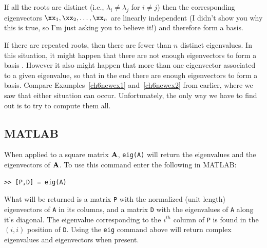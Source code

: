 If all the roots are distinct (i.e., $\lambda_i \ne \lambda_j$ for $i
\ne j$) then the corresponding eigenvectors $\xx_1,\xx_2,\ldots,\xx_n$
are linearly independent (I didn't show you why this is true, so I'm
just asking you to believe it!) and therefore form a basis.

If there are repeated roots, then there are fewer than $n$ distinct
eigenvalues. In this situation, it might happen that there are not
enough eigenvectors to form a basis . However it also might happen that
more than one eigenvector associated to a given eigenvalue, so that in
the end there are enough eigenvectors to form a basis. 
Compare Examples~\ref{ch6newex1} and~\ref{ch6newex2} from earlier, 
where we saw that either situation can occur. Unfortunately,
the only way we have to find out is to try to compute them all.

\subsection{MATLAB}
\label{s_MATeig}

When applied to a square matrix $\bf A$, {\tt eig(A)} will return the
eigenvalues and the eigenvectors of $\bf A$. To use this command enter
the following in MATLAB:
\begin{verbatim}
>> [P,D] = eig(A)
\end{verbatim}
What will be returned is a matrix {\tt P} with the normalized (unit
length) eigenvectors of {\tt A} in its columns, and a matrix {\tt D}
with the eigenvalues of {\tt A} along it's diagonal. The eigenvalue
corresponding to the $i^{th}$ column of {\tt P} is found in the
$(i,i)$ position of {\tt D}. Using the {\tt eig} command 
above will return complex eigenvalues and eigenvectors when present. 

\vspace{2mm}

